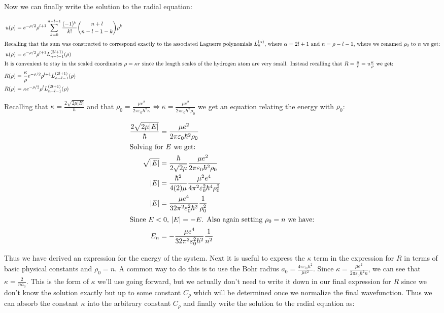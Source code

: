 \documentclass{article}
\begin{document}
    Now we can finally write the solution to the radial equation:

    \begin{align}
        u(\rho) &= e^{-\rho/2}\rho^{l+1}\sum_{k = 0}^{n - l - 1}\frac{(-1)^k}{k!}\binom{n + l}{n - l - 1 - k}\rho^{k} \\
        \intertext{Recalling that the sum was constructed to correspond exactly to the associated Laguerre polynomials $L^{(\alpha)}_{n}$, where $\alpha = 2l + 1$ and $n = \rho - l - 1$, where we
        renamed $\rho_{0}$ to $n$ we get:}
        u(\rho) &= e^{-\rho/2}\rho^{l+1}L^{(2l + 1)}_{n - l - 1}(\rho) \\
        \intertext{It is convenient to stay in the scaled coordinates $\rho = \kappa r$ since the length scales of the hydrogen atom are very small. Instead recalling that
        $R = \frac{u}{r} = u\frac{\kappa}{\rho}$ we get:}
        R(\rho) &= \frac{\kappa}{\rho}e^{-\rho/2}\rho^{l+1}L^{(2l + 1)}_{n - l - 1}(\rho) \\
        R(\rho) &= \kappa e^{-\rho/2}\rho^{l}L^{(2l + 1)}_{n - l - 1}(\rho)
    \end{align}

    Recalling that $\kappa = \frac{2\sqrt{2\mu|E|}}{\hbar}$ and that $\rho_{0} = \frac{\mu e^2}{2\pi\varepsilon_{0}\hbar^2\kappa} \iff \kappa = \frac{\mu e^{2}}{2\pi\varepsilon_{0}\hbar^2\rho_{0}}$
    we get an equation relating the energy with $\rho_{0}$:

    \begin{align}
        \frac{2\sqrt{2\mu |E|}}{\hbar} &= \frac{\mu e^{2}}{2\pi\varepsilon_{0}\hbar^2\rho_{0}} \\
        \intertext{Solving for $E$ we get:}
        \sqrt{|E|} &= \frac{\hbar}{2\sqrt{2\mu}}\frac{\mu e^{2}}{2\pi\varepsilon_{0}\hbar^2\rho_{0}} \\
        |E| &= \frac{\hbar^2}{4(2)\mu}\frac{\mu^2 e^{4}}{4\pi^2\varepsilon_{0}^2\hbar^4\rho_{0}^2} \\        
        |E| &= \frac{\mu e^{4}}{32\pi^2\varepsilon_{0}^2\hbar^2}\frac{1}{\rho_{0}^2} \\
        \intertext{Since $E < 0$, $|E| = -E$. Also again setting $\rho_{0} = n$ we have:}
        E_n &= -\frac{\mu e^{4}}{32\pi^2\varepsilon_{0}^2\hbar^2}\frac{1}{n^2}
    \end{align}

    Thus we have derived an expression for the energy of the system. Next it is useful to express the $\kappa$ term in the expression for $R$ in terms of basic physical constants and $\rho_{0} = n$.
    A common way to do this is to use the Bohr radius $a_{0} = \frac{4\pi\varepsilon_{0}\hbar^2}{\mu e^2}$. Since $\kappa = \frac{\mu e^{2}}{2\pi\varepsilon_{0}\hbar^2 n}$,
    we can see that $\kappa = \frac{2}{na_0}$. This is the form of $\kappa$ we'll use going forward, but we actually don't need to write it down in our final expression for $R$ since we don't know
    the solution exactly but up to some constant $C_{\rho}$ which will be determined once we normalize the final wavefunction. Thus we can absorb the constant $\kappa$ into the arbitrary constant $C_{\rho}$
    and finally write the solution to the radial equation as:
\end{document}
